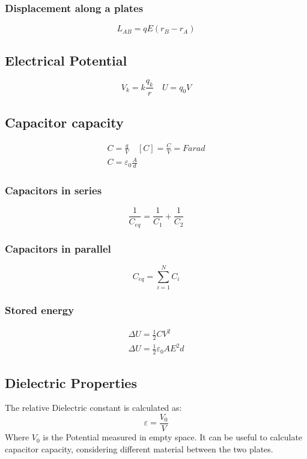 \documentclass[Master.tex]{subfiles}
\begin{document}
\begin{multicols}{2}
				   \subsubsection{Displacement along a plates}
						    \[
								     L_{AB} = qE(r_B-r_A)
						    \]

		  \subsection{Electrical Potential}

				   \[
						    V_{k} = k \frac{q_{k} }{r} \quad U = q_{0} V
				   \]

		  \subsection{Capacitor capacity}

				   \begin{gather*}
						    C = \frac{q}{V} \quad [C] = \frac{C}{V} = Farad  \\
						    C = \varepsilon_{0}   \frac{A}{d}
				   \end{gather*}

				   \subsubsection{Capacitors in series}
						    \[
								     \frac{1}{C_{eq}}= \frac{1}{C_1} + \frac{1}{C_2}
						    \]

				   \subsubsection{Capacitors in parallel}
						    \[
								     C_{eq} = \sum_{i=1}^{N} C_{i}
						    \]

				   \subsubsection{Stored energy}
						    \begin{gather*}
								     \Delta U = \frac{1}{2}CV^2\\
								     \Delta U =  \frac{1}{2} \varepsilon_{0} A E^2 d
						    \end{gather*}

		  \subsection{Dielectric Properties}
				   The relative Dielectric constant is calculated as:
				   \[
						    \varepsilon = \frac{V_{0}}{V}
				   \]
				   Where \( V_{0} \) is the Potential measured in empty space. It can be useful to
				   calculate capacitor capacity, considering different material between the two
				   plates.


\end{multicols}
\end{document}
